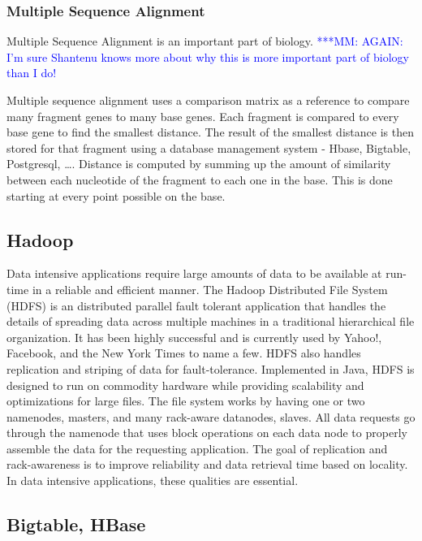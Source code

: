 \documentclass{rspublic}
\newcommand{\michaelnote}[1]{ {\textcolor{blue} { ***MM: #1 }}}
\newcommand{\michaelnote}[1]{ {\textcolor{blue} { ***MM: #1 }}}
\begin{document}
\subsubsection{Multiple Sequence Alignment}

Multiple Sequence Alignment is an important part of biology.
\michaelnote{AGAIN:  I'm sure Shantenu knows more about why this is 
more important part of biology than I do!}

Multiple sequence alignment uses a comparison matrix as a reference to
compare many fragment genes to many base genes.  Each fragment is
compared to every base gene to find the smallest distance.  The result
of the smallest distance is then stored for that fragment using a
database management system - Hbase, Bigtable, Postgresql, \ldots.
Distance is computed by summing up the amount of similarity between
each nucleotide of the fragment to each one in the base.  This is done
starting at every point possible on the base.


\subsection*{Hadoop}

Data intensive applications require large amounts of data to be
available at run-time in a reliable and efficient manner.  The Hadoop
Distributed File System (HDFS) is an distributed parallel fault
tolerant application that handles the details of spreading data across
multiple machines in a traditional hierarchical file organization.  It
has been highly successful and is currently used by Yahoo!, Facebook,
and the New York Times to name a few.  HDFS also handles replication
and striping of data for fault-tolerance.  Implemented in Java, HDFS
is designed to run on commodity hardware while providing scalability
and optimizations for large files.  The file system works by having
one or two namenodes, masters, and many rack-aware datanodes, slaves.
All data requests go through the namenode that uses block operations
on each data node to properly assemble the data for the requesting
application.  The goal of replication and rack-awareness is to improve
reliability and data retrieval time based on locality.  In data
intensive applications, these qualities are essential.

\subsection*{Bigtable, HBase}
\end{document}
